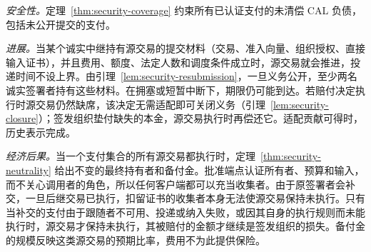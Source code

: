 \emph{安全性。}定理~\ref{thm:security-coverage} 约束所有已认证支付的未清偿 CAL 负债，包括未公开提交的支付。

\emph{进展。}当某个诚实中继持有源交易的提交材料（交易、准入向量、组织授权、直接输入证书），并且费用、额度、法定人数和调度条件成立时，源交易就会推进，投递时间不设上界。由引理~\ref{lem:security-resubmission}，一旦义务公开，至少两名诚实签署者持有这些材料。在拥塞或短暂中断下，期限仍可能到达。若赔付决定执行时源交易仍然缺席，该决定无需适配即可关闭义务（引理~\ref{lem:security-closure}）；签发组织垫付缺失的本金，源交易执行时再偿还它。适配贡献可得时，历史表示完成。

\emph{经济后果。}当一个支付集合的所有源交易都执行时，定理~\ref{thm:security-neutrality} 给出不变的最终持有者和备付金。批准端点认证所有者、预算和输入，而不关心调用者的角色，所以任何客户端都可以充当收集者。由于原签署者会补交，一旦后继交易已执行，扣留证书的收集者本身无法使源交易保持未执行。只有当补交的支付由于跟随者不可用、投递或纳入失败，或因其自身的执行规则而未能执行时，源交易才保持未执行，其被赔付的金额才继续是签发组织的损失。备付金的规模反映这类源交易的预期比率，费用不为此提供保险。
